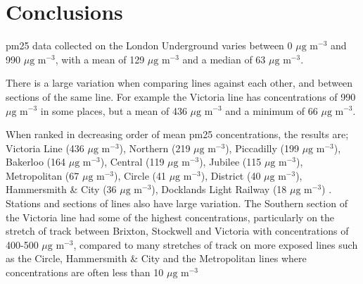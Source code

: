 \section{Conclusions}
\label{sec:3conclusions}

\gls{pm25} data collected on the London Underground varies between 0 $\mu \text{g m}^{-3}$ and 990 $\mu \text{g m}^{-3}$, with a mean of 129 $\mu \text{g m}^{-3}$ and a median of 63 $\mu \text{g m}^{-3}$.


There is a large variation when comparing lines against each other, and between sections of the same line. For example the Victoria line has concentrations of 990 $\mu \text{g m}^{-3}$ in some places, but a mean of 436 $\mu \text{g m}^{-3}$ and a minimum of 66 $\mu \text{g m}^{-3}$.


When ranked in decreasing order of mean \gls{pm25} concentrations, the results are; Victoria Line (436 $\mu \text{g m}^{-3}$), Northern (219 $\mu \text{g m}^{-3}$), Piccadilly (199 $\mu \text{g m}^{-3}$), Bakerloo (164 $\mu \text{g m}^{-3}$), Central (119 $\mu \text{g m}^{-3}$), Jubilee (115 $\mu \text{g m}^{-3}$), Metropolitan (67 $\mu \text{g m}^{-3}$), Circle (41 $\mu \text{g m}^{-3}$), District (40 $\mu \text{g m}^{-3}$), Hammersmith \& City (36 $\mu \text{g m}^{-3}$), Docklands Light Railway (18 $\mu \text{g m}^{-3}$) . Stations and sections of lines also have large variation. The Southern section of the Victoria line had some of the highest concentrations, particularly on the stretch of track between Brixton, Stockwell and Victoria with concentrations of 400-500 $\mu \text{g m}^{-3}$, compared to many stretches of track on more exposed lines such as the Circle, Hammersmith \& City and the Metropolitan lines where concentrations are often  less than 10 $\mu \text{g m}^{-3}$



